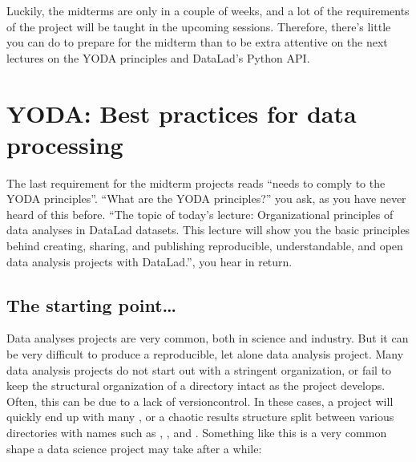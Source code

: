 \sphinxAtStartPar
Luckily, the midterms are only in a couple of weeks, and a lot of the
requirements of the project will be taught in the upcoming sessions.
Therefore, there’s little you can do to prepare for the midterm
than to be extra attentive on the next lectures on the YODA
principles and DataLad’s Python API.

\sphinxstepscope

\ignorespaces 

\section{YODA: Best practices for data processing}
\label{\detokenize{basics/101-127-yoda:yoda-best-practices-for-data-analyses-in-a-dataset}}\label{\detokenize{basics/101-127-yoda:yoda}}\label{\detokenize{basics/101-127-yoda:id1}}\label{\detokenize{basics/101-127-yoda:index-0}}\label{\detokenize{basics/101-127-yoda::doc}}
\sphinxAtStartPar
The last requirement for the midterm projects reads “needs to comply to the
YODA principles”.
“What are the YODA principles?” you ask, as you have never heard of this
before.
“The topic of today’s lecture: Organizational principles of data
analyses in DataLad datasets. This lecture will show you the basic
principles behind creating, sharing, and publishing reproducible,
understandable, and open data analysis projects with DataLad.”, you
hear in return.


\subsection{The starting point…}
\label{\detokenize{basics/101-127-yoda:the-starting-point}}
\sphinxAtStartPar
Data analyses projects are very common, both in science and industry.
But it can be very difficult to produce a reproducible, let alone
 data analysis project.
Many data analysis projects do not start out with
a stringent organization, or fail to keep the structural organization of a
directory intact as the project develops. Often, this can be due to a lack of
version\sphinxhyphen{}control. In these cases, a project will quickly end up
with many
,
or a chaotic results structure split between various directories with names
such as , ,  and
. Something like this is a very
common shape a data science project may take after a while:

